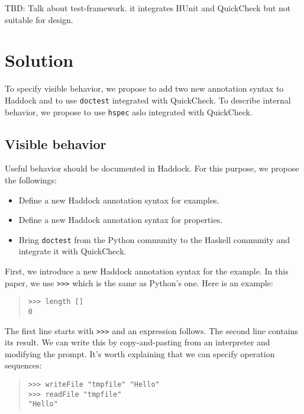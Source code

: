 \documentclass[preprint]{sigplanconf}
\begin{document}
TBD: Talk about test-framework. it integrates HUnit and QuickCheck but not 
suitable for design.

\section{Solution}

To specify visible behavior, we propose to add two new annotation syntax to Haddock and to use {\tt doctest} integrated with QuickCheck. To describe internal behavior, we propose to use {\tt hspec} aslo integrated with QuickCheck.

\subsection{Visible behavior}
\label{sec:Visible-behavior}

Useful behavior should be documented in Haddock. 
For this purpose, we propose the followings:

\begin{itemize}
\item Define a new Haddock annotation syntax for examples.
\item Define a new Haddock annotation syntax for properties.
\item Bring {\tt doctest} from the Python community to the Haskell
community and integrate it with QuickCheck.
\end{itemize}

First, we introduce a new Haddock annotation syntax for the example.
In this paper, we use {\tt >>>} which is the same as Python's one.
Here is an example:

\begin{quote}
\small
\begin{verbatim}
>>> length []
0
\end{verbatim}
\end{quote}

\noindent The first line starts with {\tt >>>} and an expression follows. The second line contains its result. We can write this by copy-and-pasting from an interpreter and modifying the prompt.
It's worth explaining that we can specify operation sequences:

\begin{quote}
\small
\begin{verbatim}
>>> writeFile "tmpfile" "Hello"
>>> readFile "tmpfile"
"Hello"
\end{verbatim}
\end{quote}
\end{document}
